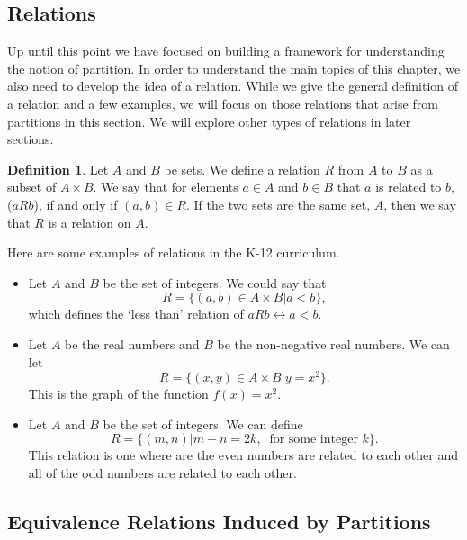 \documentclass[
]{book}
\theoremstyle{definition}
\newtheorem{definition}{Definition}[chapter]
\theoremstyle{definition}
\theoremstyle{definition}
\theoremstyle{definition}
\theoremstyle{remark}
\begin{document}
\hypertarget{relations}{%
\subsection{Relations}\label{relations}}

Up until this point we have focused on building a framework for understanding the notion of partition. In order to understand the main topics of this chapter, we also need to develop the idea of a relation. While we give the general definition of a relation and a few examples, we will focus on those relations that arise from partitions in this section. We will explore other types of relations in later sections.

\begin{definition}
\protect\hypertarget{def:relation}{}\label{def:relation}Let \(A\) and \(B\) be sets. We define a relation \(R\) from \(A\) to \(B\) as a subset of \(A\times B\). We say that for elements \(a\in A\) and \(b\in B\) that \(a\) is related to \(b\), (\(aRb\)), if and only if \((a,b)\in R\). If the two sets are the same set, \(A\), then we say that \(R\) is a relation on \(A\).
\end{definition}

Here are some examples of relations in the K-12 curriculum.

\begin{itemize}
\item
  Let \(A\) and \(B\) be the set of integers. We could say that \[R=\{(a,b)\in A\times B \vert a<b\},\] which defines the `less than' relation of \(aRb \leftrightarrow a<b\).
\item
  Let \(A\) be the real numbers and \(B\) be the non-negative real numbers. We can let \[R=\{(x,y)\in A\times B \vert y=x^2\}.\] This is the graph of the function \(f(x)=x^2\).
\item
  Let \(A\) and \(B\) be the set of integers. We can define \[R= \{(m,n) \vert m-n=2k, \: \mbox{ for some integer } k\}.\] This relation is one where are the even numbers are related to each other and all of the odd numbers are related to each other.
\end{itemize}

\hypertarget{equivalence-relations-induced-by-partitions}{%
\subsection{Equivalence Relations Induced by Partitions}\label{equivalence-relations-induced-by-partitions}}
\end{document}
